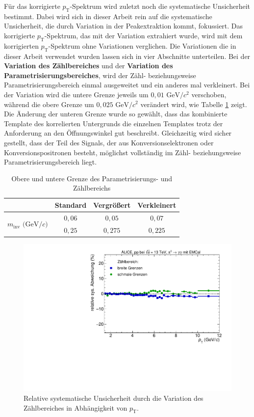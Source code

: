 Für das korrigierte $p_\text{T}$-Spektrum wird zuletzt noch die systematische Unsicherheit bestimmt.
Dabei wird sich in dieser Arbeit rein auf die systematische Unsicherheit, die durch Variation in der Peakextraktion kommt, fokussiert.
Das korrigierte $p_\text{T}$-Spektrum, das mit der Variation extrahiert wurde, wird mit dem korrigierten $p_\text{T}$-Spektrum ohne Variationen verglichen.
Die Variationen die in dieser Arbeit verwendet wurden lassen sich in vier Abschnitte unterteilen.
\newline
Bei der \textbf{Variation des Zählbereiches} und der \textbf{Variation des Parametrisierungsbereiches}, wird der Zähl- beziehungsweise Parametrisierungsbereich einmal ausgeweitet und ein anderes mal verkleinert.
Bei der Variation wird die untere Grenze jeweils um $0,01 \text{ GeV}/c^{2}$ verschoben, während die obere Grenze um $0,025 \text{ GeV}/c^{2}$ verändert wird, wie Tabelle \ref{tab:ParamAndIntRange} zeigt.
Die Änderung der unteren Grenze wurde so gewählt, dass das kombinierte Template des korrelierten Untergrunds die einzelnen Templates trotz der Anforderung an den Öffnungswinkel gut beschreibt.
Gleichzeitig wird sicher gestellt, dass der Teil des Signals, der aus Konversionselektronen oder Konversionspositronen besteht, möglichst vollständig im Zähl- beziehungsweise Parametrisierungsbereich liegt.
\begin{table}[b!]
\centering
\begin{tabular}{c|c||c||c|}
\cline{2-4}
                                                                      & Standard & Vergr{\"o}{\ss}ert & Verkleinert \\ \hline
\multicolumn{1}{|c|}{\multirow{2}{*}{$m_\text{inv}\text{ (GeV}/c)$}} & $0,06$   & $0,05$             & $0,07$      \\ \cline{2-4} 
\multicolumn{1}{|c|}{}                                                & $0,25$   & $0,275$            & $0,225$     \\ \hline
\end{tabular}
\caption{Obere und untere Grenze des Parametrisierungs- und Zählbereichs}
\label{tab:ParamAndIntRange}
\end{table}
\begin{figure}[t]
\centering
\includegraphics[width=.65\linewidth]{YieldsSysUncerIntRange_Data_2016.pdf}
\caption{Relative systematische Unsicherheit durch die Variation des Zählbereiches in Abhängigkeit von $p_\text{T}$.}
\label{fig:IntSys}
\end{figure}
